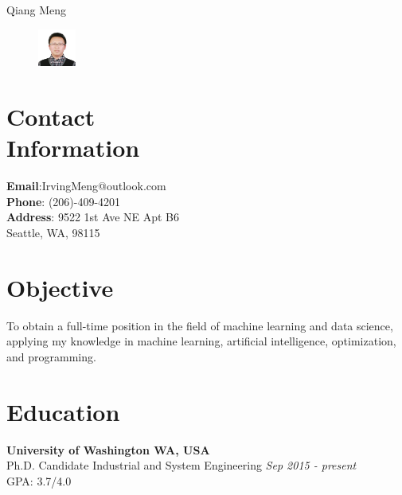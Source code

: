 \documentclass[margin,line,11pt]{resume}
\begin{document}
{\sc \Large Qiang Meng}
\begin{resume}


    \vspace{0.5cm}
    \begin{figure}
         \vspace{-0.9cm}
        \begin{center}
        \includegraphics[width=0.11\textwidth]{face}
        \end{center}
         \vspace{-1cm}
    \end{figure}

 
    \section{\mysidestyle Contact\\Information}
    \textbf{Email}:\hspace{1.5em}\quad  IrvingMeng@outlook.com \\
    \textbf{Phone}: \hspace{1.5em} (206)-409-4201\\ 
    \textbf{Address}: \hspace{1em}9522 1st Ave NE Apt B6\\
     \hspace*{6em}Seattle, WA, 98115 

    \section{\mysidestyle  Objective}
 To obtain a full-time position in the field of machine learning and data science, applying my knowledge in machine learning, artificial intelligence, optimization, and programming.
      

     \section{\mysidestyle Education}
     \textbf{University of Washington  \hfill WA, USA}\\
Ph.D. Candidate \quad  Industrial and System Engineering \hfill \textit{Sep 2015 - present}\\
 GPA: 3.7/4.0 \par


\end{resume}
\end{document}
